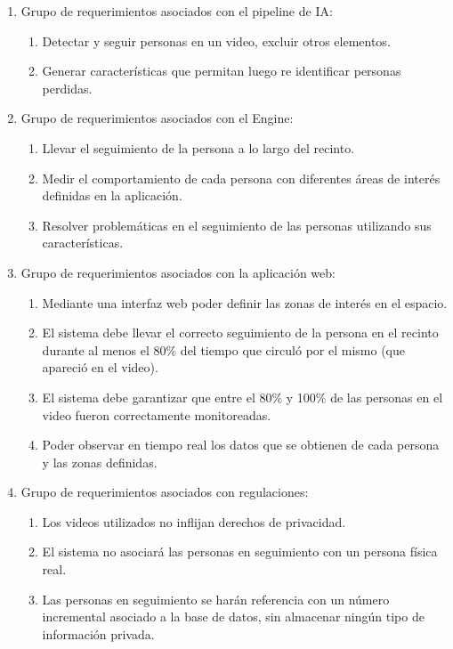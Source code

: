 \documentclass[11pt]{charter}
\begin{document}
\begin{enumerate}
\item Grupo de requerimientos asociados con el pipeline de IA:
	\begin{enumerate}
	\item Detectar y seguir personas en un video, excluir otros elementos.
	\item Generar características que permitan luego re identificar personas perdidas.
	\end{enumerate}
\item Grupo de requerimientos asociados con el Engine:
	\begin{enumerate}
	\item Llevar el seguimiento de la persona a lo largo del recinto.
	\item Medir el comportamiento de cada persona con diferentes áreas de interés definidas en la aplicación.
	\item Resolver problemáticas en el seguimiento de las personas utilizando sus características.
	\end{enumerate}
\item Grupo de requerimientos asociados con la aplicación web:
\begin{enumerate}
	\item Mediante una interfaz web poder definir las zonas de interés en el espacio.
	\item El sistema debe llevar el correcto seguimiento de la persona en el recinto durante al menos el 80\% del tiempo que circuló por el mismo (que apareció en el video).
	\item El sistema debe garantizar que entre el 80\% y 100\% de las personas en el video fueron correctamente monitoreadas.
	\item Poder observar en tiempo real los datos que se obtienen de cada persona y las zonas definidas.
	\end{enumerate}
\item Grupo de requerimientos asociados con regulaciones:
\begin{enumerate}
	\item Los videos utilizados no inflijan derechos de privacidad.
	\item El sistema no asociará las personas en seguimiento con un persona física real.
	\item Las personas en seguimiento se harán referencia con un número incremental asociado a la base de datos, sin almacenar ningún tipo de información privada.
	\end{enumerate}
\end{enumerate}
\end{document}
